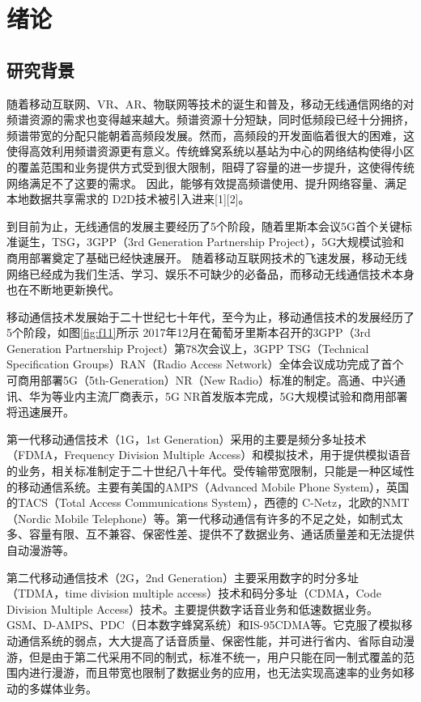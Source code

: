 	\chapter{绪论}
	\section{研究背景}
	随着移动互联网、VR、AR、物联网等技术的诞生和普及，移动无线通信网络的对频谱资源的需求也变得越来越大。频谱资源十分短缺，同时低频段已经十分拥挤，频谱带宽的分配只能朝着高频段发展。然而，高频段的开发面临着很大的困难，这使得高效利用频谱资源更有意义。传统蜂窝系统以基站为中心的网络结构使得小区的覆盖范围和业务提供方式受到很大限制，阻碍了容量的进一步提升，这使得传统网络满足不了这要的需求。
	因此，能够有效提高频谱使用、提升网络容量、满足本地数据共享需求的 D2D技术被引入进来[1][2]。



	到目前为止，无线通信的发展主要经历了5个阶段，随着里斯本会议5G首个关键标准诞生，TSG，3GPP（3rd Generation Partnership Project），5G大规模试验和商用部署奠定了基础已经快速展开。
	随着移动互联网技术的飞速发展，移动无线网络已经成为我们生活、学习、娱乐不可缺少的必备品，而移动无线通信技术本身也在不断地更新换代。


	移动通信技术发展始于二十世纪七十年代，至今为止，移动通信技术的发展经历了5个阶段，如图\ref{fig:f11}所示
	2017年12月在葡萄牙里斯本召开的3GPP（3rd Generation Partnership Project）第78次会议上，3GPP TSG（Technical Specification Groups）RAN（Radio Access Network）全体会议成功完成了首个可商用部署5G（5th-Generation）NR（New Radio）标准的制定。高通、中兴通讯、华为等业内主流厂商表示，5G NR首发版本完成，5G大规模试验和商用部署将迅速展开。


	第一代移动通信技术（1G，1st Generation）采用的主要是频分多址技术（FDMA，Frequency Division Multiple Access）和模拟技术，用于提供模拟语音的业务，相关标准制定于二十世纪八十年代。受传输带宽限制，只能是一种区域性的移动通信系统。主要有美国的AMPS（Advanced Mobile Phone System），英国的TACS（Total Access Communications System），西德的 C-Netz，北欧的NMT（Nordic Mobile Telephone）等。第一代移动通信有许多的不足之处，如制式太多、容量有限、互不兼容、保密性差、提供不了数据业务、通话质量差和无法提供自动漫游等。


	第二代移动通信技术（2G，2nd Generation）主要采用数字的时分多址（TDMA，time division multiple access）技术和码分多址（CDMA，Code Division Multiple Access）技术。主要提供数字话音业务和低速数据业务。GSM、D-AMPS、PDC（日本数字蜂窝系统）和IS-95CDMA等。它克服了模拟移动通信系统的弱点，大大提高了话音质量、保密性能，并可进行省内、省际自动漫游，但是由于第二代采用不同的制式，标准不统一，用户只能在同一制式覆盖的范围内进行漫游，而且带宽也限制了数据业务的应用，也无法实现高速率的业务如移动的多媒体业务。


